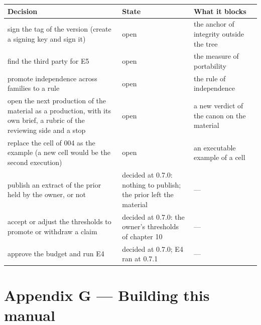 \documentclass[
  american,
  10pt,
]{report}
\newcounter{none} %
\begin{document}
{\def\LTcaptype{none} %
\begin{longtable}[]{@{}
  >{\raggedright\arraybackslash}p{}
  >{\raggedright\arraybackslash}p{}
  >{\raggedright\arraybackslash}p{}@{}}
\toprule\noalign{}
\begin{minipage}[b]{\linewidth}\raggedright
Decision
\end{minipage} & \begin{minipage}[b]{\linewidth}\raggedright
State
\end{minipage} & \begin{minipage}[b]{\linewidth}\raggedright
What it blocks
\end{minipage} \\
\midrule\noalign{}
\endhead
\bottomrule\noalign{}
\endlastfoot
sign the tag of the version (create a signing key and sign it) & open &
the anchor of integrity outside the tree \\
find the third party for E5 & open & the measure of portability \\
promote independence across families to a rule & open & the rule of
independence \\
open the next production of the material as a production, with its own
brief, a rubric of the reviewing side and a stop & open & a new verdict
of the canon on the material \\
replace the cell of 004 as the example (a new cell would be the second
execution) & open & an executable example of a cell \\
publish an extract of the prior held by the owner, or not & decided at
0.7.0: nothing to publish; the prior left the material & --- \\
accept or adjust the thresholds to promote or withdraw a claim & decided
at 0.7.0: the owner's thresholds of chapter 10 & --- \\
approve the budget and run E4 & decided at 0.7.0; E4 ran at 0.7.1 &
--- \\
\end{longtable}
}

\chapter*{Appendix G --- Building this
manual}\label{appendix-g-building-this-manual}
\end{document}
